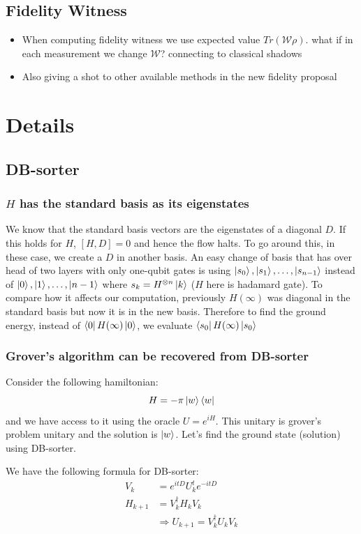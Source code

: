 \documentclass[11pt]{article}
\begin{document}
\subsection{Fidelity Witness}
\begin{itemize}
    \item When computing fidelity witness we use expected value $Tr(\mathcal{W}\rho)$. what if in each measurement we change $\mathcal{W}$? connecting to classical shadows
    \item Also giving a shot to other available methods in the new fidelity proposal
\end{itemize}

\section{Details}
\subsection{DB-sorter}
\subsubsection{$H$ has the standard basis as its eigenstates}
\label{sec:shared-basis}
We know that the standard basis vectors are the eigenstates of a diagonal $D$. If this holds for $H$, $[H, D] = 0$ and hence the flow halts. To go around this, in these case, we create a $D$ in another basis. An easy change of basis that has over head of two layers with only one-qubit gates is using $\ket{s_0}, \ket{s_1}, \dots, \ket{s_{n-1}}$ instead of $\ket{0}, \ket{1}, \dots, \ket{n-1}$ where $s_k = H^{\otimes n}\ket{k}$ ($H$ here is hadamard gate). To compare how it affects our computation, previously $H(\infty)$ was diagonal in the standard basis but now it is in the new basis. Therefore to find the ground energy, instead of $\bra{0}H(\infty)\ket{0}$, we evaluate $\bra{s_0}H(\infty)\ket{s_0}$

\subsubsection{Grover's algorithm can be recovered from DB-sorter}
\label{sec:grover-recovery}
Consider the following hamiltonian:
$$
H = -\pi\ket{w}\bra{w}
$$
and we have access to it using the oracle $U = e^{iH}$. This unitary is grover's problem unitary and the solution is $\ket{w}$. Let's find the ground state (solution) using DB-sorter.

We have the following formula for DB-sorter:
\begin{align}
V_k &= e^{itD} U_k^{t} e^{-itD} \\
H_{k+1} &= V_k^\dagger H_k V_k \\
&\Rightarrow U_{k+1} = V_k^\dagger U_k V_k
\end{align}
\end{document}
